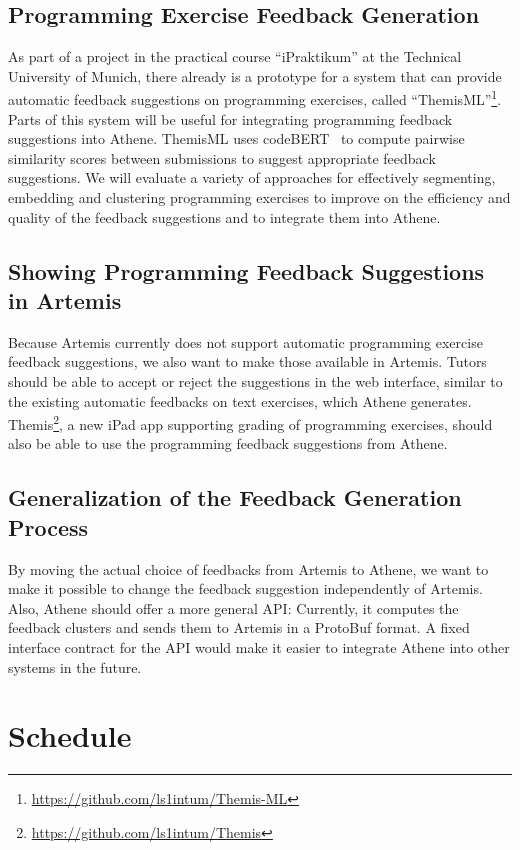 \subsection*{Programming Exercise Feedback Generation}
As part of a project in the practical course \enquote{iPraktikum} at the Technical University of Munich, there already is a prototype for a system that can provide automatic feedback suggestions on programming exercises, called \enquote{ThemisML}\footnote{\url{https://github.com/ls1intum/Themis-ML}}. 
Parts of this system will be useful for integrating programming feedback suggestions into Athene. ThemisML uses codeBERT~\cite{codeBERT} to compute pairwise similarity scores between submissions to suggest appropriate feedback suggestions. We will evaluate a variety of approaches for effectively segmenting, embedding and clustering programming exercises to improve on the efficiency and quality of the feedback suggestions and to integrate them into Athene.

\subsection*{Showing Programming Feedback Suggestions in Artemis}
Because Artemis currently does not support automatic programming exercise feedback suggestions, we also want to make those available in Artemis. Tutors should be able to accept or reject the suggestions in the web interface, similar to the existing automatic feedbacks on text exercises, which Athene generates. Themis\footnote{\url{https://github.com/ls1intum/Themis}}, a new iPad app supporting grading of programming exercises, should also be able to use the programming feedback suggestions from Athene.

\subsection*{Generalization of the Feedback Generation Process}
By moving the actual choice of feedbacks from Artemis to Athene, we want to make it possible to change the feedback suggestion independently of Artemis. Also, Athene should offer a more general API: Currently, it computes the feedback clusters and sends them to Artemis in a ProtoBuf format. A fixed interface contract for the API would make it easier to integrate Athene into other systems in the future.


\section*{Schedule}

